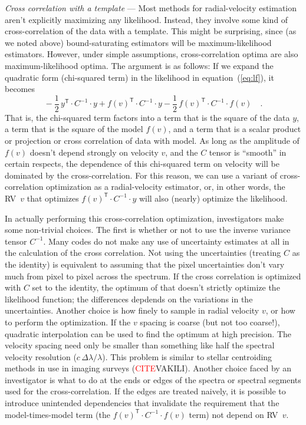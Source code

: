 \documentclass[modern]{aastex63}
\newcommand{\T}{^{\mathsf{T}}}
\renewcommand{\paragraph}[1]{\bigskip\par\noindent\textsl{#1} ---}
\newcommand{\todo}[1]{\textcolor{red}{#1}}  %
\newcommand{\CITE}{\todo{CITE}}
\newcommand{\acronym}[1]{{\small{#1}}}
\newcommand{\RV}{\acronym{RV}}
\begin{document}
\paragraph{Cross correlation with a template}
Most methods for radial-velocity estimation aren't explicitly maximizing
any likelihood.
Instead, they involve some kind of
cross-correlation of the data with a template.
This might be surprising, since (as we noted above) bound-saturating
estimators will be maximum-likelihood estimators.
However, under simple assumptions, cross-correlation optima are
also maximum-likelihood optima. The argument is as follows:
If we expand the quadratic form (chi-squared term) in the
likelihood in equation~(\ref{eq:lf}), it becomes
\begin{equation}
 {}-\frac{1}{2}\,y\T\cdot C^{-1}\cdot y
            + f(v)\T\cdot C^{-1}\cdot y
-\frac{1}{2}\,f(v)\T\cdot C^{-1}\cdot f(v) \quad.
\end{equation}
That is, the chi-squared term factors into a term that is the square
of the data $y$, a term that is the square of the model $f(v)$,
and a term that is a scalar product or projection or
cross correlation of data with model.
As long as the amplitude of $f(v)$ doesn't depend strongly on velocity $v$,
and the $C$ tensor is ``smooth'' in certain respects, the dependence of this
chi-squared term on velocity will be dominated by the
cross-correlation.
For this reason, we can use a variant of cross-correlation
optimization as a radial-velocity estimator, or, in other words, the
\RV\ $v$ that optimizes $f(v)\T\cdot C^{-1}\cdot y$ will also (nearly)
optimize the likelihood.

In actually performing this cross-correlation optimization,
investigators make some non-trivial choices.
The first is whether or not to use the inverse variance tensor $C^{-1}$.
Many codes do not make any use of uncertainty estimates at all in
the calculation of the cross correlation.
Not using the uncertainties (treating $C$ as the identity) is
equivalent to assuming that the pixel uncertainties don't vary much
from pixel to pixel across the spectrum.
If the cross correlation is optimized with $C$ set to the identity,
the optimum of that doesn't strictly optimize the likelihood function;
the differences depdends on the variations in the uncertainties.
Another choice is how finely to sample in radial velocity $v$, or how
to perform the optimization.
If the $v$ spacing is coarse (but not too coarse!), quadratic
interpolation can be used to find the optimum at high precision.
The velocity spacing need only be smaller than something like half the
spectral velocity resolution ($c\,\Delta\lambda / \lambda$).
This problem is similar to stellar centroiding methods in use in
imaging surveys (\CITE VAKILI).
Another choice faced by an investigator is what to do at the ends or
edges of the spectra or spectral segments used for the
cross-correlation.
If the edges are treated naively, it is possible to introduce unintended
dependencies that invalidate the requirement that the model-times-model term
(the $f(v)\T\cdot C^{-1}\cdot f(v)$ term) not depend on \RV\ $v$.
\end{document}
